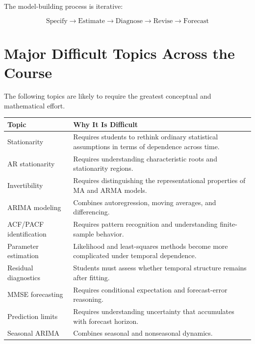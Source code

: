 \documentclass[11pt,a4paper]{article}
\begin{document}
The model-building process is iterative:

\[
\boxed{
\text{Specify}
\rightarrow
\text{Estimate}
\rightarrow
\text{Diagnose}
\rightarrow
\text{Revise}
\rightarrow
\text{Forecast}
}
\]

\section{Major Difficult Topics Across the Course}

The following topics are likely to require the greatest conceptual and
mathematical effort.

\begin{longtable}{p{}p{}}
\toprule
\textbf{Topic} & \textbf{Why It Is Difficult} \\
\midrule
Stationarity &
Requires students to rethink ordinary statistical assumptions in terms of
dependence across time. \\

AR stationarity &
Requires understanding characteristic roots and stationarity regions. \\

Invertibility &
Requires distinguishing the representational properties of MA and ARMA
models. \\

ARIMA modeling &
Combines autoregression, moving averages, and differencing. \\

ACF/PACF identification &
Requires pattern recognition and understanding finite-sample behavior. \\

Parameter estimation &
Likelihood and least-squares methods become more complicated under temporal
dependence. \\

Residual diagnostics &
Students must assess whether temporal structure remains after fitting. \\

MMSE forecasting &
Requires conditional expectation and forecast-error reasoning. \\

Prediction limits &
Requires understanding uncertainty that accumulates with forecast horizon. \\

Seasonal ARIMA &
Combines seasonal and nonseasonal dynamics. \\


\end{longtable}
\end{document}
